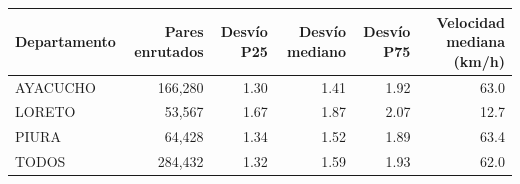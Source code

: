 \begin{tabular}{lrrrrr}
\toprule
Departamento & Pares enrutados & Desvío P25 & Desvío mediano & Desvío P75 & Velocidad mediana (km/h) \\
\midrule
AYACUCHO & 166,280 & 1.30 & 1.41 & 1.92 & 63.0 \\
LORETO & 53,567 & 1.67 & 1.87 & 2.07 & 12.7 \\
PIURA & 64,428 & 1.34 & 1.52 & 1.89 & 63.4 \\
TODOS & 284,432 & 1.32 & 1.59 & 1.93 & 62.0 \\
\bottomrule
\end{tabular}
